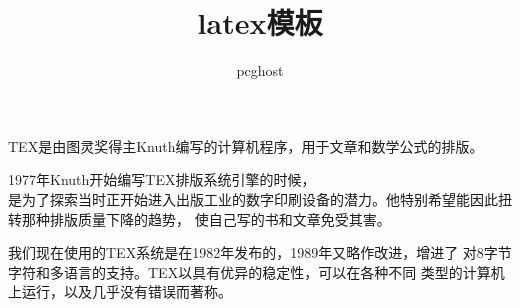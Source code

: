 \documentclass[a4paper,12pt]{article}
\begin{document}
\begin{CJK*}{GBK}{song}                           %

\author{pcghost}                                 %
\title{latex模板}                                %
\maketitle                                       %

TEX是由图灵奖得主Knuth编写的计算机程序，用于文章和数学公式的排版。

1977年Knuth开始编写TEX排版系统引擎的时候，\\ %
是为了探索当时正开始进入出版工业的数字印刷设备的潜力。他特别希望能因此扭转那种排版质量下降的趋势，
使自己写的{书和文章}免受其害。

\clearpage %
我们现在使用的TEX系统是在1982年发布的，1989年又略作改进，增进了
对8字节字符和多语言的支持。TEX以具有优异的稳定性，可以在各种不同
类型的计算机上运行，以及几乎没有错误而著称。
\end{CJK*}     %
\end{document}
